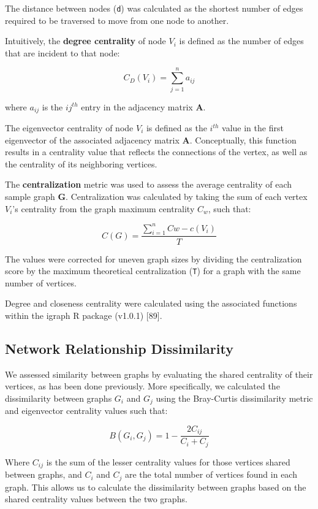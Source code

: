 \documentclass[12pt,]{article}
\begin{document}
The distance between nodes (\texttt{d}) was calculated as the shortest
number of edges required to be traversed to move from one node to
another.

Intuitively, the \textbf{degree centrality} of node \(V_i\) is defined
as the number of edges that are incident to that node:

\[ { C }_{ D }\left( { V }_{ i } \right) =\sum _{ j=1 }^{ n }{ { a }_{ ij } } \]

where \(a_{ij}\) is the \(ij^{th}\) entry in the adjacency matrix
\(\mathbf{A}\).

The eigenvector centrality of node \(V_i\) is defined as the \(i^{th}\)
value in the first eigenvector of the associated adjacency matrix
\(\mathbf{A}\). Conceptually, this function results in a centrality
value that reflects the connections of the vertex, as well as the
centrality of its neighboring vertices.

The \textbf{centralization} metric was used to assess the average
centrality of each sample graph \(\mathbf{G}\). Centralization was
calculated by taking the sum of each vertex \(V_{i}\)'s centrality from
the graph maximum centrality \(C_{w}\), such that:

\[ C\left( G \right) =\frac { \sum _{ i=1 }^{ n }{ Cw -c\left( { V }_{ i } \right)  }  }{ { T } }  \]

The values were corrected for uneven graph sizes by dividing the
centralization score by the maximum theoretical centralization
(\texttt{T}) for a graph with the same number of vertices.

Degree and closeness centrality were calculated using the associated
functions within the igraph R package (v1.0.1) {[}89{]}.

\subsection{Network Relationship
Dissimilarity}\label{network-relationship-dissimilarity}

We assessed similarity between graphs by evaluating the shared
centrality of their vertices, as has been done previously. More
specifically, we calculated the dissimilarity between graphs \(G_{i}\)
and \(G_{j}\) using the Bray-Curtis dissimilarity metric and eigenvector
centrality values such that:

\[ B\left( { G }_{ i },{ G }_{ j } \right) =1-\frac { 2{ C }_{ ij } }{ { C }_{ i }+{ C }_{ j } } \]

Where \(C_{ij}\) is the sum of the lesser centrality values for those
vertices shared between graphs, and \(C_{i}\) and \(C_{j}\) are the
total number of vertices found in each graph. This allows us to
calculate the dissimilarity between graphs based on the shared
centrality values between the two graphs.
\end{document}
